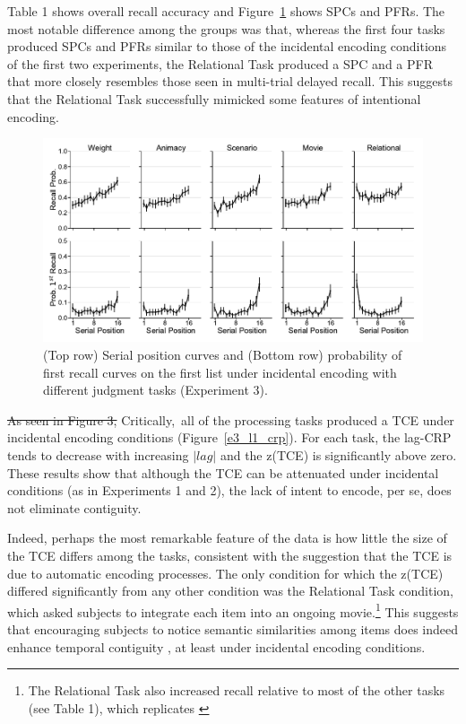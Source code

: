 \documentclass[man,natbib,floatsintext]{apa6} %
\begin{document}
\color{red}
Table 1 shows overall recall accuracy and Figure~\ref{e3_l1_spc} shows SPCs and PFRs. The most notable difference among the groups was that, whereas the first four tasks produced SPCs and PFRs similar to those of the incidental encoding conditions of the first two experiments, the Relational Task produced a SPC and a PFR that more closely resembles those seen in multi-trial delayed recall. This suggests that the Relational Task successfully mimicked some features of intentional encoding.

\begin{figure}
\includegraphics{figures/E3_spc_list1.pdf}
\caption{(Top row) Serial position curves and (Bottom row) probability of first recall curves on the first list under incidental encoding with different judgment tasks (Experiment 3). \spcpaneltext}
\label{e3_l1_spc}
\end{figure}

\color{black}

\st{As seen in Figure 3,}\color{red} Critically,\color{black}~all of the processing tasks produced a TCE under incidental encoding conditions \color{red}(Figure~\ref{e3_l1_crp})\color{black}. For each task, the lag-CRP tends to decrease with increasing $|lag|$ and the z(TCE) is significantly above zero. These results show that although the TCE can be attenuated under incidental conditions (as in Experiments 1 and 2), the lack of intent to encode, per se, does not eliminate contiguity.

Indeed, perhaps the most remarkable feature of the data is how little the size of the TCE differs among the tasks, consistent with the suggestion that the TCE is due to automatic encoding processes. The only condition for which the z(TCE) differed significantly from any other condition was the Relational Task condition, which asked subjects to integrate each item into an ongoing movie.\footnote{The Relational Task also increased recall relative to most of the other tasks (see Table 1), which replicates \citet{BowClar69}} This suggests that encouraging subjects to notice semantic similarities among items does indeed enhance temporal contiguity \citep{Hint16}, at least under incidental encoding conditions.
\end{document}
